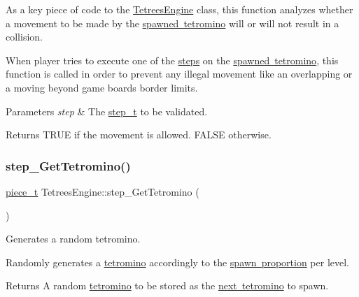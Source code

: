 As a key piece of code to the \mbox{\hyperlink{classTetreesEngine}{Tetrees\+Engine}} class, this function analyzes whether a movement to be made by the \mbox{\hyperlink{classTetreesEngine_a26435ee2f02d9ba70d9e359745114f6e}{spawned tetromino}} will or will not result in a collision.

When player tries to execute one of the \mbox{\hyperlink{TetreesDefs_8hpp_a4d5a793092a473f85b4c1f7faf62afed}{steps}} on the \mbox{\hyperlink{classTetreesEngine_a26435ee2f02d9ba70d9e359745114f6e}{spawned tetromino}}, this function is called in order to prevent any illegal movement like an overlapping or a moving beyond game board\textquotesingle{}s border limits. 
\begin{DoxyParams}{Parameters}
{\em step} & The \mbox{\hyperlink{TetreesDefs_8hpp_a4d5a793092a473f85b4c1f7faf62afed}{step\+\_\+t}} to be validated. \\
\hline
\end{DoxyParams}
\begin{DoxyReturn}{Returns}
{\ttfamily T\+R\+UE} if the movement is allowed. {\ttfamily F\+A\+L\+SE} otherwise. 
\end{DoxyReturn}
\mbox{\label{classTetreesEngine_a94d5fd25eec05994f02bb514496ec66d}} 
\subsubsection{\texorpdfstring{step\+\_\+\+Get\+Tetromino()}{step\_GetTetromino()}}
{\footnotesize\ttfamily \mbox{\hyperlink{structpiece__t}{piece\+\_\+t}} Tetrees\+Engine\+::step\+\_\+\+Get\+Tetromino (\begin{DoxyParamCaption}{ }\end{DoxyParamCaption})\hspace{0.3cm}{\ttfamily [private]}}



Generates a random tetromino. 

Randomly generates a \mbox{\hyperlink{structpiece__t}{tetromino}} accordingly to the \mbox{\hyperlink{TetreesDefs_8hpp_t_prop}{spawn proportion}} per level. \begin{DoxyReturn}{Returns}
A random \mbox{\hyperlink{structpiece__t}{tetromino}} to be stored as the \mbox{\hyperlink{classTetreesEngine_a44c902481f5d8a72ca8a78d24f5c3a33}{next tetromino}} to spawn. 
\end{DoxyReturn}
\mbox{\label{classTetreesEngine_a270b227c9dfbfb72513c6cdfdd910d1b}} 

